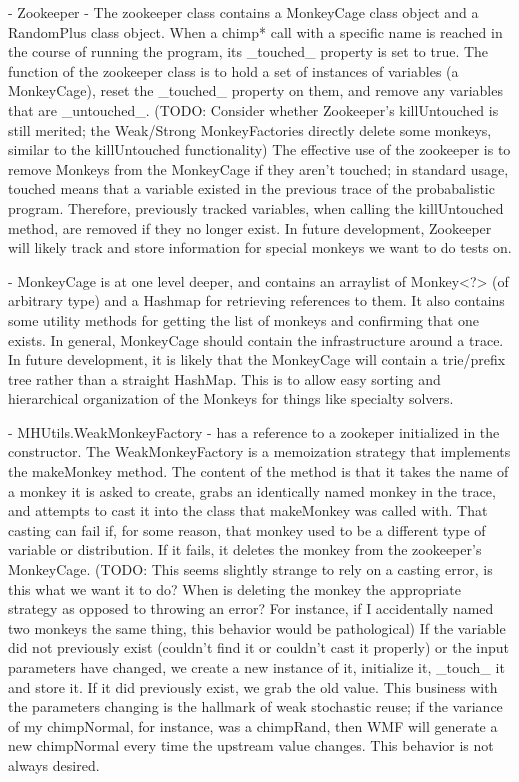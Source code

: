 - Zookeeper - The zookeeper class contains a MonkeyCage class object and a RandomPlus class object. When a chimp* call with a specific name is reached in the course of running the program, its _touched_ property is set to true. The function of the zookeeper class is to hold a set of instances of variables (a MonkeyCage), reset the _touched_ property on them, and remove any variables that are _untouched_. (TODO: Consider whether Zookeeper's killUntouched is still merited; the Weak/Strong MonkeyFactories directly delete some monkeys, similar to the killUntouched functionality) The effective use of the zookeeper is to remove Monkeys from the MonkeyCage if they aren't touched; in standard usage, touched means that a variable existed in the previous trace of the probabalistic program. Therefore, previously tracked variables, when calling the killUntouched method, are removed if they no longer exist.
In future development, Zookeeper will likely track and store information for special monkeys we want to do tests on.

- MonkeyCage is at one level deeper, and contains an arraylist of Monkey<?> (of arbitrary type) and a Hashmap for retrieving references to them. It also contains some utility methods for getting the list of monkeys and confirming that one exists. In general, MonkeyCage should contain the infrastructure around a trace. In future development, it is likely that the MonkeyCage will contain a trie/prefix tree rather than a straight HashMap. This is to allow easy sorting and hierarchical organization of the Monkeys for things like specialty solvers.

- MHUtils.WeakMonkeyFactory - has a reference to a zookeper initialized in the constructor. The WeakMonkeyFactory is a memoization strategy that implements the makeMonkey method. The content of the method is that it takes the name of a monkey it is asked to create, grabs an identically named monkey in the trace, and attempts to cast it into the class that makeMonkey was called with. That casting can fail if, for some reason, that monkey used to be a different type of variable or distribution. If it fails, it deletes the monkey from the zookeeper's MonkeyCage.
(TODO: This seems slightly strange to rely on a casting error, is this what we want it to do? When is deleting the monkey the appropriate strategy as opposed to throwing an error? For instance, if I accidentally named two monkeys the same thing, this behavior would be pathological)
If the variable did not previously exist (couldn't find it or couldn't cast it properly) or the input parameters have changed, we create a new instance of it, initialize it, _touch_ it and store it. If it did previously exist, we grab the old value. This business with the parameters changing is the hallmark of weak stochastic reuse; if the variance of my chimpNormal, for instance, was a chimpRand, then WMF will generate a new chimpNormal every time the upstream value changes. This behavior is not always desired.

